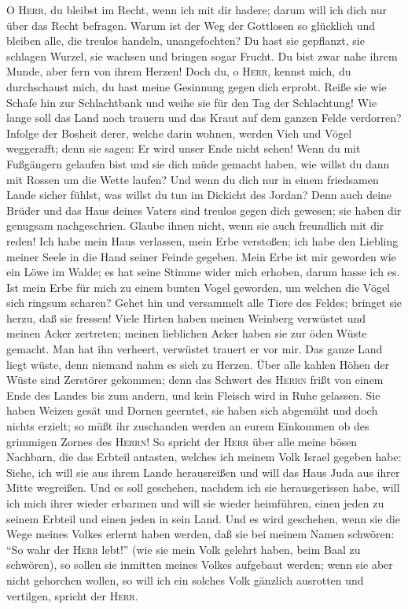  O \textsc{Herr}, du bleibst im Recht, wenn ich mit dir
hadere; darum will ich dich nur über das Recht befragen. Warum ist der
Weg der Gottlosen so glücklich und bleiben alle, die treulos handeln,
unangefochten?  Du hast sie gepflanzt, sie schlagen
Wurzel, sie wachsen und bringen sogar Frucht. Du bist zwar nahe ihrem
Munde, aber fern von ihrem Herzen!  Doch du, o
\textsc{Herr}, kennst mich, du durchschaust mich, du hast meine
Gesinnung gegen dich erprobt. Reiße sie wie Schafe hin zur Schlachtbank
und weihe sie für den Tag der Schlachtung!  Wie lange soll
das Land noch trauern und das Kraut auf dem ganzen Felde verdorren?
Infolge der Bosheit derer, welche darin wohnen, werden Vieh und Vögel
weggerafft; denn sie sagen: Er wird unser Ende nicht sehen!
 Wenn du mit Fußgängern gelaufen bist und sie dich müde
gemacht haben, wie willst du dann mit Rossen um die Wette laufen? Und
wenn du dich nur in einem friedsamen Lande sicher fühlst, was willst du
tun im Dickicht des Jordan?  Denn auch deine Brüder und
das Haus deines Vaters sind treulos gegen dich gewesen; sie haben dir
genugsam nachgeschrien. Glaube ihnen nicht, wenn sie auch freundlich mit
dir reden!  Ich habe mein Haus verlassen, mein Erbe
verstoßen; ich habe den Liebling meiner Seele in die Hand seiner Feinde
gegeben.  Mein Erbe ist mir geworden wie ein Löwe im
Walde; es hat seine Stimme wider mich erhoben, darum hasse ich es.
 Ist mein Erbe für mich zu einem bunten Vogel geworden, um
welchen die Vögel sich ringsum scharen? Gehet hin und versammelt alle
Tiere des Feldes; bringet sie herzu, daß sie fressen! 
Viele Hirten haben meinen Weinberg verwüstet und meinen Acker zertreten;
meinen lieblichen Acker haben sie zur öden Wüste gemacht.
 Man hat ihn verheert, verwüstet trauert er vor mir. Das
ganze Land liegt wüste, denn niemand nahm es sich zu Herzen.
 Über alle kahlen Höhen der Wüste sind Zerstörer
gekommen; denn das Schwert des \textsc{Herrn} frißt von einem Ende des
Landes bis zum andern, und kein Fleisch wird in Ruhe gelassen.
 Sie haben Weizen gesät und Dornen geerntet, sie haben
sich abgemüht und doch nichts erzielt; so müßt ihr zuschanden werden an
eurem Einkommen ob des grimmigen Zornes des \textsc{Herrn}!
 So spricht der \textsc{Herr} über alle meine bösen
Nachbarn, die das Erbteil antasten, welches ich meinem Volk Israel
gegeben habe: Siehe, ich will sie aus ihrem Lande herausreißen und will
das Haus Juda aus ihrer Mitte wegreißen.  Und es soll
geschehen, nachdem ich sie herausgerissen habe, will ich mich ihrer
wieder erbarmen und will sie wieder heimführen, einen jeden zu seinem
Erbteil und einen jeden in sein Land. Und es wird geschehen,
 wenn sie die Wege meines Volkes erlernt haben werden,
daß sie bei meinem Namen schwören: ``So wahr der \textsc{Herr} lebt!''
(wie sie mein Volk gelehrt haben, beim Baal zu schwören), so sollen sie
inmitten meines Volkes aufgebaut werden;  wenn sie aber
nicht gehorchen wollen, so will ich ein solches Volk gänzlich ausrotten
und vertilgen, spricht der \textsc{Herr}.

